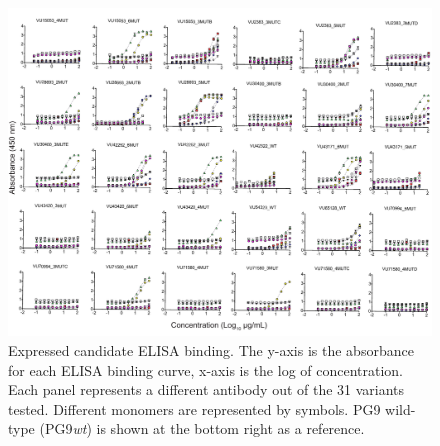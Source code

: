 \begin{figure}
   \centering
   \includegraphics[scale=.75]{images/chapter3/figure3_16.pdf} %
   \caption[Expressed Candidate ELISA Binding]{Expressed candidate ELISA binding. The y-axis is the absorbance for each ELISA binding curve, x-axis is the log of concentration. Each panel represents a different antibody out of the 31 variants tested. Different monomers are represented by symbols. PG9 wild-type (PG9\textit{wt}) is shown at the bottom right as a reference.}
   \label{fig:figure3_16}
\end{figure}

